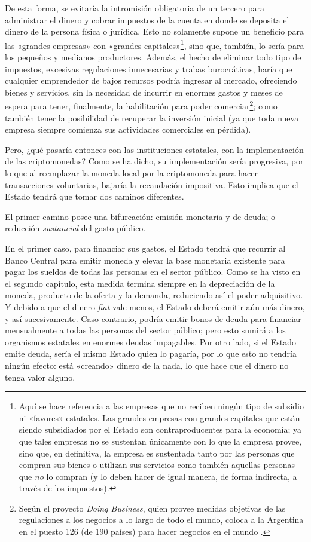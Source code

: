 \documentclass[12pt,a4paper,twoside]{book}
\begin{document}
De esta forma, se evitaría la intromisión obligatoria de un tercero para administrar el dinero y cobrar impuestos de la cuenta en donde se deposita el dinero de la persona física o jurídica. Esto no solamente supone un beneficio para las «grandes empresas» con «grandes capitales»\footnote{Aquí se hace referencia a las empresas que no reciben ningún tipo de subsidio ni «favores» estatales. Las grandes empresas con grandes capitales que están siendo subsidiados por el Estado son contraproducentes para la economía; ya que tales empresas no se sustentan únicamente con lo que la empresa provee, sino que, en definitiva, la empresa es sustentada tanto por las personas que compran sus bienes o utilizan sus servicios como también aquellas personas que \textit{no} lo compran (y lo deben hacer de igual manera, de forma indirecta, a través de los impuestos).}, sino que, también, lo sería para los pequeños y medianos productores. Además, el hecho de eliminar todo tipo de impuestos, excesivas regulaciones innecesarias y trabas burocráticas, haría que cualquier emprendedor de bajos recursos podría ingresar al mercado, ofreciendo bienes y servicios, sin la necesidad de incurrir en enormes gastos y meses de espera para tener, finalmente, la habilitación para poder comerciar\footnote{Según el proyecto \textit{Doing Business}, quien provee medidas objetivas de las regulaciones a los negocios a lo largo de todo el mundo, coloca a la Argentina en el puesto 126 (de 190 países) para hacer negocios en el mundo \cite{doing-business:arg}.}; como también tener la posibilidad de recuperar la inversión inicial (ya que toda nueva empresa siempre comienza sus actividades comerciales en pérdida).

Pero, ¿qué pasaría entonces con las instituciones estatales, con la implementación de las criptomonedas? Como se ha dicho, su implementación sería progresiva, por lo que al reemplazar la moneda local por la criptomoneda para hacer transacciones voluntarias, bajaría la recaudación impositiva. Esto implica que el Estado tendrá que tomar dos caminos diferentes.

El primer camino posee una bifurcación: emisión monetaria y de deuda; o reducción \textit{sustancial} del gasto público.

En el primer caso, para financiar sus gastos, el Estado tendrá que recurrir al Banco Central para emitir moneda y elevar la base monetaria existente para pagar los sueldos de todas las personas en el sector público. Como se ha visto en el segundo capítulo, esta medida termina siempre en la depreciación de la moneda, producto de la oferta y la demanda, reduciendo así el poder adquisitivo. Y debido a que el dinero \textit{fiat} vale menos, el Estado deberá emitir aún más dinero, y así sucesivamente. Caso contrario, podría emitir bonos de deuda para financiar mensualmente a todas las personas del sector público; pero esto sumirá a los organismos estatales en enormes deudas impagables. Por otro lado, si el Estado emite deuda, sería el mismo Estado quien lo pagaría, por lo que esto no tendría ningún efecto: está «creando» dinero de la nada, lo que hace que el dinero no tenga valor alguno.
\end{document}
